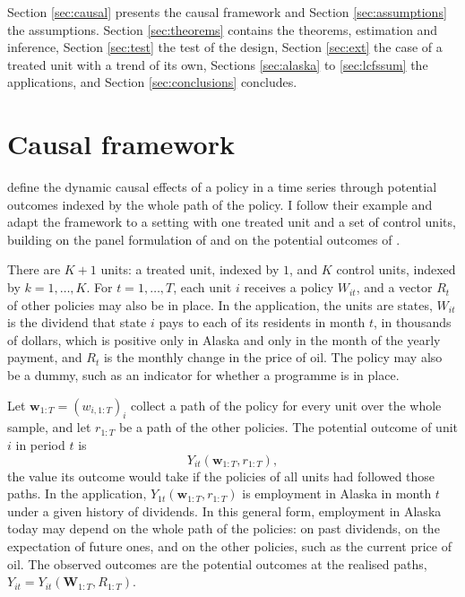 \documentclass[12pt,a4paper]{article}
\theoremstyle{definition}
\theoremstyle{definition}\newtheorem{example}{Example}
\theoremstyle{definition}\newtheorem{definition}{Definition}
\begin{document}
Section \ref{sec:causal} presents the causal framework and Section \ref{sec:assumptions} the assumptions. Section \ref{sec:theorems} contains the theorems, estimation and inference, Section \ref{sec:test} the test of the design, Section \ref{sec:ext} the case of a treated unit with a trend of its own, Sections \ref{sec:alaska} to \ref{sec:lcfssum} the applications, and Section \ref{sec:conclusions} concludes.

\section{Causal framework\label{sec:causal}}

\citet{RambachanSheppard2021} define the dynamic causal effects of a policy in a time series through potential outcomes indexed by the whole path of the policy. I follow their example and adapt the framework to a setting with one treated unit and a set of control units, building on the panel formulation of \citet{bojinovshephard2019} and on the potential outcomes of \citet{Rubin1980}.

There are $K+1$ units: a treated unit, indexed by $1$, and $K$ control units, indexed by $k=1,\dots,K$. For $t=1,\dots,T$, each unit $i$ receives a policy $W_{it}$, and a vector $R_t$ of other policies may also be in place. In the application, the units are states, $W_{it}$ is the dividend that state $i$ pays to each of its residents in month $t$, in thousands of dollars, which is positive only in Alaska and only in the month of the yearly payment, and $R_t$ is the monthly change in the price of oil. The policy may also be a dummy, such as an indicator for whether a programme is in place.

Let $\mathbf{w}_{1:T}=(w_{i,1:T})_{i}$ collect a path of the policy for every unit over the whole sample, and let $r_{1:T}$ be a path of the other policies. The potential outcome of unit $i$ in period $t$ is
\begin{equation}
Y_{it}(\mathbf{w}_{1:T},r_{1:T}),
\label{eq:po}
\end{equation}
the value its outcome would take if the policies of all units had followed those paths. In the application, $Y_{1t}(\mathbf{w}_{1:T},r_{1:T})$ is employment in Alaska in month $t$ under a given history of dividends. In this general form, employment in Alaska today may depend on the whole path of the policies: on past dividends, on the expectation of future ones, and on the other policies, such as the current price of oil. The observed outcomes are the potential outcomes at the realised paths, $Y_{it}=Y_{it}(\mathbf{W}_{1:T},R_{1:T})$.
\end{document}

